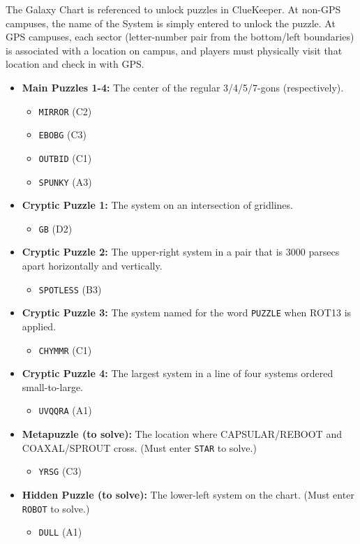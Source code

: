 The Galaxy Chart is referenced to unlock puzzles in ClueKeeper.
At non-GPS campuses, the name of the System is simply entered to
unlock the puzzle. At GPS campuses, each sector (letter-number pair
from the bottom/left boundaries) is associated with a location on
campus, and players must physically visit that location and check
in with GPS. 

\begin{itemize}
\item
  \textbf{Main Puzzles 1-4:} The center of the regular 3/4/5/7-gons (respectively).
  \begin{itemize}
  \item \texttt{MIRROR} (C2)
  \item \texttt{EBOBG} (C3)
  \item \texttt{OUTBID} (C1)
  \item \texttt{SPUNKY} (A3)
  \end{itemize}
\item
  \textbf{Cryptic Puzzle 1:} The system on an intersection of gridlines.
\begin{itemize}\item\texttt{GB} (D2)\end{itemize}
\item
  \textbf{Cryptic Puzzle 2:} The upper-right system in a pair that is 3000 parsecs
  apart horizontally and vertically. 
\begin{itemize}\item\texttt{SPOTLESS} (B3)\end{itemize}
\item
  \textbf{Cryptic Puzzle 3:} The system named for the word \texttt{PUZZLE} when
  ROT13 is applied. 
\begin{itemize}\item\texttt{CHYMMR} (C1)\end{itemize}
\item
  \textbf{Cryptic Puzzle 4:} The largest system in a line of four systems ordered small-to-large. 
\begin{itemize}\item\texttt{UVQQRA} (A1)\end{itemize}
\item
  \textbf{Metapuzzle (to solve):} The location where CAPSULAR/REBOOT and COAXAL/SPROUT cross.
  (Must enter \texttt{STAR} to solve.)
\begin{itemize}\item\texttt{YRSG} (C3)\end{itemize}
\item
  \textbf{Hidden Puzzle (to solve):} The lower-left system on the chart. (Must enter \texttt{ROBOT} to solve.)
\begin{itemize}\item\texttt{DULL} (A1)\end{itemize}
\end{itemize} 
